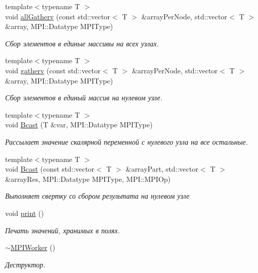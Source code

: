 \begin{DoxyCompactItemize}
{\footnotesize template$<$typename T $>$ }\\void \hyperlink{classMPIWorker_a32a3813263d8f44468978fddbf9f6452}{all\-Gatherv} (const std\-::vector$<$ T $>$ \&array\-Per\-Node, std\-::vector$<$ T $>$ \&array, M\-P\-I\-::\-Datatype M\-P\-I\-Type)
\begin{DoxyCompactList}\small\item\em Сбор элементов в единые массивы на всех узлах. \end{DoxyCompactList}\item 
{\footnotesize template$<$typename T $>$ }\\void \hyperlink{classMPIWorker_a319cb96fc82faf7a1111382e9fa59e25}{gatherv} (const std\-::vector$<$ T $>$ \&array\-Per\-Node, std\-::vector$<$ T $>$ \&array, M\-P\-I\-::\-Datatype M\-P\-I\-Type)
\begin{DoxyCompactList}\small\item\em Сбор элементов в единый массив на нулевом узле. \end{DoxyCompactList}\item 
{\footnotesize template$<$typename T $>$ }\\void \hyperlink{classMPIWorker_aaa4402c33f6919b07ee6900981a61b8a}{Bcast} (T \&var, M\-P\-I\-::\-Datatype M\-P\-I\-Type)
\begin{DoxyCompactList}\small\item\em Рассылает значение скалярной переменной с нулевого узла на все остальные. \end{DoxyCompactList}\item 
{\footnotesize template$<$typename T $>$ }\\void \hyperlink{classMPIWorker_a4304837a9bdf53a7d8d123b279659fbd}{Bcast} (const std\-::vector$<$ T $>$ \&array\-Part, std\-::vector$<$ T $>$ \&array\-Res, M\-P\-I\-::\-Datatype M\-P\-I\-Type, M\-P\-I\-::\-M\-P\-I\-Op)
\begin{DoxyCompactList}\small\item\em Выполняет свертку со сбором результата на нулевом узле \end{DoxyCompactList}\item 
void \hyperlink{classMPIWorker_ae1625b662cb13204ae8a5ad434bbc43b}{print} ()
\begin{DoxyCompactList}\small\item\em Печать значений, хранимых в полях. \end{DoxyCompactList}\item 
\hyperlink{classMPIWorker_a91bb9809bb89ea7d24b85273d7b551a9}{$\sim$\-M\-P\-I\-Worker} ()
\begin{DoxyCompactList}\small\item\em Деструктор. \end{DoxyCompactList}\end{DoxyCompactItemize}


